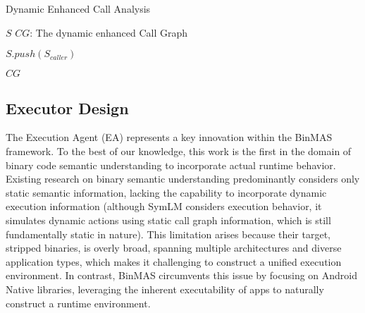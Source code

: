 \documentclass[acmsmall,screen,review,anonymous]{acmart} %
\begin{document}


\begin{algorithm}
  \caption{Dynamic Enhanced Call Analysis}
  \label{alg:CallAnalysis}
  \begin{algorithmic}[1]
    \REQUIRE $S$
    \ENSURE $CG$: The dynamic enhanced Call Graph

        \STATE $S.push(S_{caller})$
    \ENDFOR

    \ENDFOR
    \RETURN $CG$
  \end{algorithmic}
\end{algorithm}





\subsection{Executor Design}

The Execution Agent (EA) represents a key innovation within the BinMAS framework. To the best of our knowledge, this work is the first in the domain of binary code semantic understanding to incorporate actual runtime behavior. Existing research on binary semantic understanding predominantly considers only static semantic information, lacking the capability to incorporate dynamic execution information (although SymLM considers execution behavior, it simulates dynamic actions using static call graph information, which is still fundamentally static in nature). This limitation arises because their target, stripped binaries, is overly broad, spanning multiple architectures and diverse application types, which makes it challenging to construct a unified execution environment. In contrast, BinMAS circumvents this issue by focusing on Android Native libraries, leveraging the inherent executability of apps to naturally construct a runtime environment.
\end{document}
